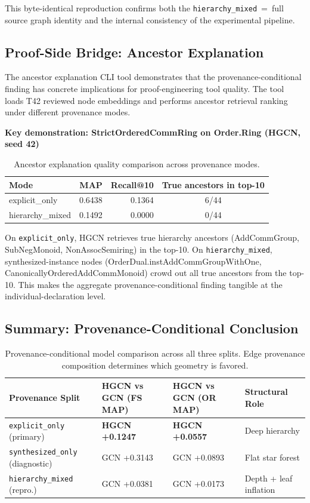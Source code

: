 \documentclass[runningheads]{llncs}
\begin{document}
This byte-identical reproduction confirms both the \texttt{hierarchy\_mixed}~=~full source graph identity and the internal consistency of the experimental pipeline.

\subsection{Proof-Side Bridge: Ancestor Explanation}

The ancestor explanation CLI tool demonstrates that the provenance-conditional finding has concrete implications for proof-engineering tool quality. The tool loads T42 reviewed node embeddings and performs ancestor retrieval ranking under different provenance modes.

\textbf{Key demonstration: StrictOrderedCommRing on Order.Ring (HGCN, seed 42)}

\begin{table}[h]
\centering
\caption{Ancestor explanation quality comparison across provenance modes.}
\label{tab:proof-side}
\begin{tabular}{lrrc}
\toprule
Mode & MAP & Recall@10 & True ancestors in top-10 \\
\midrule
explicit\_only   & 0.6438 & 0.1364 & 6/44 \\
hierarchy\_mixed & 0.1492 & 0.0000 & 0/44 \\
\bottomrule
\end{tabular}
\end{table}

On \texttt{explicit\_only}, HGCN retrieves true hierarchy ancestors (AddCommGroup, SubNegMonoid, NonAssocSemiring) in the top-10. On \texttt{hierarchy\_mixed}, synthesized-instance nodes (OrderDual.instAddCommGroupWithOne, CanonicallyOrderedAddCommMonoid) crowd out all true ancestors from the top-10. This makes the aggregate provenance-conditional finding tangible at the individual-declaration level.

\subsection{Summary: Provenance-Conditional Conclusion}

\begin{table}[h]
\centering
\caption{Provenance-conditional model comparison across all three splits. Edge provenance composition determines which geometry is favored.}
\label{tab:summary}
\begin{tabular}{llll}
\toprule
Provenance Split & HGCN vs GCN (FS MAP) & HGCN vs GCN (OR MAP) & Structural Role \\
\midrule
\texttt{explicit\_only} (primary)       & \textbf{HGCN +0.1247} & \textbf{HGCN +0.0557} & Deep hierarchy \\
\texttt{synthesized\_only} (diagnostic) & GCN +0.3143           & GCN +0.0893           & Flat star forest \\
\texttt{hierarchy\_mixed} (repro.)      & GCN +0.0381           & GCN +0.0173           & Depth + leaf inflation \\
\bottomrule
\end{tabular}
\end{table}
\end{document}
